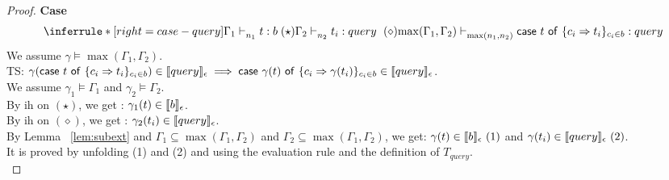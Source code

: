 \documentclass{article}
\begin{document}
\begin{proof}
  \noindent \textbf{Case}
  \[
   \inferrule*[ right = case-query]
   {\Gamma_1 \jtype{n_1}{}{t}{b}(\star) \\ \Gamma_2 \jtype{n_2}{}{t_i}{query}~(\diamond) }
   {\max(\Gamma_1, \Gamma_2) \jtype{\max(n_1,n_2)}{}{\tcaseof{t}\ \{c_i \Rightarrow t_i\}_{c_i \in b} } {query} }
  \]
  We assume $\gamma \vDash \max(\Gamma_1, \Gamma_2) $.\\
  TS: $\gamma(\mathsf{case}~t~\mathsf{of}\ \{c_i \Rightarrow t_i\}_{c_i \in b}) \in \llbracket {query} \rrbracket_{\epsilon} \implies \mathsf{case}~\gamma(t)~\mathsf{of}\ \{c_i \Rightarrow \gamma(t_i)\}_{c_i \in b} \in \llbracket {query} \rrbracket_{\epsilon} $.\\
  We assume $\gamma_1 \vDash \Gamma_1$ and $\gamma_2 \vDash \Gamma_2 $.\\
  By ih on $(\star)$, we get : $ \gamma_1(t) \in \llbracket {b} \rrbracket_{\epsilon}$.\\
  By ih on $(\diamond)$, we get : $ \gamma_2(t_i) \in \llbracket {query} \rrbracket_{\epsilon}$.\\
  By Lemma ~\ref{lem:subext} and $\Gamma_1 \subseteq \max(\Gamma_1,\Gamma_2) $ and $ \Gamma_2 \subseteq \max(\Gamma_1,\Gamma_2) $, we get: $\gamma(t) \in \llbracket {b} \rrbracket_{\epsilon}~(1) $ and $ \gamma(t_i) \in \llbracket {query} \rrbracket_{\epsilon}~(2)$.\\
   It is proved by unfolding (1) and (2) and using the evaluation rule  and the definition of $T_{query}$.\\ 
  
  
 
 \end{proof}

\clearpage
\end{document}
